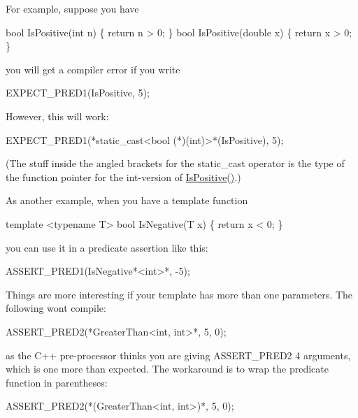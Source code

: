 For example, suppose you have


\begin{DoxyCode}
bool IsPositive(int n) \{
  return n > 0;
\}
bool IsPositive(double x) \{
  return x > 0;
\}
\end{DoxyCode}


you will get a compiler error if you write


\begin{DoxyCode}
EXPECT\_PRED1(IsPositive, 5);
\end{DoxyCode}


However, this will work\+:


\begin{DoxyCode}
EXPECT\_PRED1(*static\_cast<bool (*)(int)>*(IsPositive), 5);
\end{DoxyCode}


(The stuff inside the angled brackets for the {\ttfamily static\+\_\+cast} operator is the type of the function pointer for the {\ttfamily int}-\/version of {\ttfamily \hyperlink{namespacetesting_1_1gmock__matchers__test_a70e728cf67d0224c3ebb9eb8959cc39d}{Is\+Positive()}}.)

As another example, when you have a template function


\begin{DoxyCode}
template <typename T>
bool IsNegative(T x) \{
  return x < 0;
\}
\end{DoxyCode}


you can use it in a predicate assertion like this\+:


\begin{DoxyCode}
ASSERT\_PRED1(IsNegative*<int>*, -5);
\end{DoxyCode}


Things are more interesting if your template has more than one parameters. The following won\textquotesingle{}t compile\+:


\begin{DoxyCode}
ASSERT\_PRED2(*GreaterThan<int, int>*, 5, 0);
\end{DoxyCode}


as the C++ pre-\/processor thinks you are giving {\ttfamily A\+S\+S\+E\+R\+T\+\_\+\+P\+R\+E\+D2} 4 arguments, which is one more than expected. The workaround is to wrap the predicate function in parentheses\+:


\begin{DoxyCode}
ASSERT\_PRED2(*(GreaterThan<int, int>)*, 5, 0);
\end{DoxyCode}


